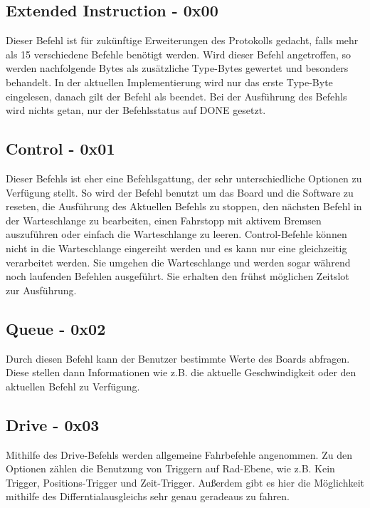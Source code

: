 \documentclass[a4paper]{article}
\begin{document}
	\subsection{Extended Instruction - 0x00}

	Dieser Befehl ist für zukünftige Erweiterungen des Protokolls gedacht, falls mehr als 15 verschiedene Befehle
	benötigt werden. Wird dieser Befehl angetroffen, so werden nachfolgende Bytes als zusätzliche Type-Bytes gewertet
	und besonders behandelt.
	In der aktuellen Implementierung wird nur das erste Type-Byte eingelesen, danach gilt der Befehl als beendet. Bei der
	Ausführung des Befehls wird nichts getan, nur der Befehlsstatus auf DONE gesetzt.

	\subsection{Control - 0x01}

	Dieser Befehls ist eher eine Befehlsgattung, der sehr unterschiedliche Optionen zu Verfügung stellt. So wird der
	Befehl benutzt um das Board und die Software zu reseten, die Ausführung des Aktuellen Befehls zu stoppen, den
	nächsten Befehl in der Warteschlange zu bearbeiten, einen Fahrstopp mit aktivem Bremsen auszuführen oder einfach die
	Warteschlange zu leeren. 
	Control-Befehle können nicht in die Warteschlange eingereiht werden und es kann nur eine gleichzeitig verarbeitet werden.
	Sie umgehen die Warteschlange und werden sogar während noch laufenden Befehlen ausgeführt. Sie erhalten den frühst
	möglichen Zeitslot zur Ausführung.

	\subsection{Queue - 0x02}

	Durch diesen Befehl kann der Benutzer bestimmte Werte des Boards abfragen. Diese stellen dann Informationen
	wie z.B. die aktuelle Geschwindigkeit oder den aktuellen Befehl zu Verfügung.

	\subsection{Drive - 0x03}

	Mithilfe des Drive-Befehls werden allgemeine Fahrbefehle angenommen. Zu den Optionen zählen die Benutzung von Triggern
	auf Rad-Ebene, wie z.B. Kein Trigger, Positions-Trigger und Zeit-Trigger. Außerdem gibt es hier die Möglichkeit
	mithilfe des Differntialausgleichs sehr genau geradeaus zu fahren.
\end{document}
